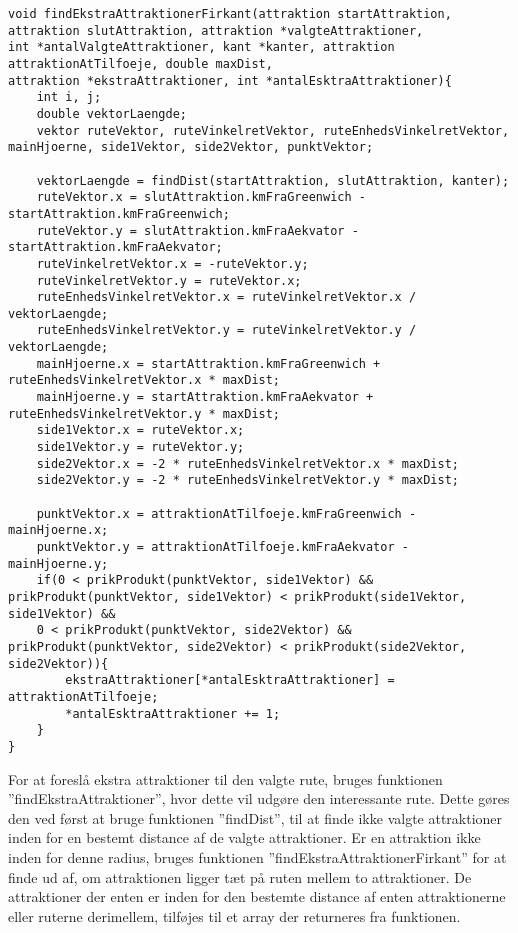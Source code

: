 \begin{lstlisting}
void findEkstraAttraktionerFirkant(attraktion startAttraktion, attraktion slutAttraktion, attraktion *valgteAttraktioner, 
int *antalValgteAttraktioner, kant *kanter, attraktion attraktionAtTilfoeje, double maxDist, 
attraktion *ekstraAttraktioner, int *antalEsktraAttraktioner){
	int i, j;
	double vektorLaengde;
	vektor ruteVektor, ruteVinkelretVektor, ruteEnhedsVinkelretVektor, mainHjoerne, side1Vektor, side2Vektor, punktVektor;
	
	vektorLaengde = findDist(startAttraktion, slutAttraktion, kanter);
	ruteVektor.x = slutAttraktion.kmFraGreenwich - startAttraktion.kmFraGreenwich;
	ruteVektor.y = slutAttraktion.kmFraAekvator - startAttraktion.kmFraAekvator;
	ruteVinkelretVektor.x = -ruteVektor.y;
	ruteVinkelretVektor.y = ruteVektor.x;
	ruteEnhedsVinkelretVektor.x = ruteVinkelretVektor.x / vektorLaengde;
	ruteEnhedsVinkelretVektor.y = ruteVinkelretVektor.y / vektorLaengde;
	mainHjoerne.x = startAttraktion.kmFraGreenwich + ruteEnhedsVinkelretVektor.x * maxDist;
	mainHjoerne.y = startAttraktion.kmFraAekvator + ruteEnhedsVinkelretVektor.y * maxDist;
	side1Vektor.x = ruteVektor.x;
	side1Vektor.y = ruteVektor.y;
	side2Vektor.x = -2 * ruteEnhedsVinkelretVektor.x * maxDist;
	side2Vektor.y = -2 * ruteEnhedsVinkelretVektor.y * maxDist;
	
	punktVektor.x = attraktionAtTilfoeje.kmFraGreenwich - mainHjoerne.x;
	punktVektor.y = attraktionAtTilfoeje.kmFraAekvator - mainHjoerne.y;
	if(0 < prikProdukt(punktVektor, side1Vektor) && prikProdukt(punktVektor, side1Vektor) < prikProdukt(side1Vektor, side1Vektor) &&
	0 < prikProdukt(punktVektor, side2Vektor) && prikProdukt(punktVektor, side2Vektor) < prikProdukt(side2Vektor, side2Vektor)){
		ekstraAttraktioner[*antalEsktraAttraktioner] = attraktionAtTilfoeje;
		*antalEsktraAttraktioner += 1;
	}
}
\end{lstlisting}

For at foreslå ekstra attraktioner til den valgte rute, bruges funktionen ”findEkstraAttraktioner”, hvor dette vil udgøre den interessante rute. Dette gøres den ved først at bruge funktionen ”findDist”, til at finde ikke valgte attraktioner inden for en bestemt distance af de valgte attraktioner. Er en attraktion ikke inden for denne radius, bruges funktionen ”findEkstraAttraktionerFirkant” for at finde ud af, om attraktionen ligger tæt på ruten mellem to attraktioner. De attraktioner der enten er inden for den bestemte distance af enten attraktionerne eller ruterne derimellem, tilføjes til et array der returneres fra funktionen.

